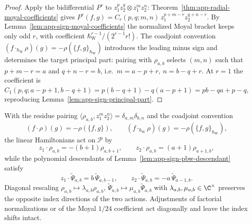\begin{proof}
  Apply the bidifferential \(P^r\) to
  \(z_1^pz_2^q\otimes z_1^mz_2^n\):
  Theorem~\ref{thm:app-radial-moyal-coefficients} gives
  \(P^r(f,g)=C_r(p,q;m,n)\,z_1^{p+m-r}z_2^{q+n-r}\).  By
  Lemma~\ref{lem:app-sign-moyal-coefficients} the normalized Moyal
  bracket keeps only odd \(r\), with coefficient
  \(\hbar_{\mathrm{W}}^{r-1}/(2^{r-1}r!)\).  The coadjoint convention
  \((f\cdot_{\hbar_{\mathrm{W}}}\rho)(g)=-\rho(\{f,g\}_{\hbar_{\mathrm{W}}})\) introduces the
  leading minus sign and determines the target principal part: pairing with
  \(\rho_{a,b}\) selects \((m,n)\) such that \(p+m-r=a\) and
  \(q+n-r=b\), i.e.\ \(m=a-p+r,\ n=b-q+r\).  At \(r=1\) the
  coefficient is
  \(C_1(p,q;a-p+1,b-q+1)=p(b-q+1)-q(a-p+1)=pb-qa+p-q\),
  reproducing Lemma~\ref{lem:app-sign-principal-part}.
\end{proof}

\begin{cor}
\label{cor:app-sign-universal-dual-normalization}
  With the residue pairing
  \(\langle\rho_{a,b},z_1^mz_2^n\rangle=\delta_{a,m}\delta_{b,n}\) and
  the coadjoint convention
  \[
    (f\cdot\rho)(g)=-\rho(\{f,g\}),\qquad
    (f\cdot_{\hbar_{\mathrm{W}}}\rho)(g)=-\rho(\{f,g\}_{\hbar_{\mathrm{W}}}),
  \]
  the linear Hamiltonians act on \(\mathcal P\) by
  \[
    z_1\cdot\rho_{a,b}=-(b+1)\rho_{a,b+1},\qquad
    z_2\cdot\rho_{a,b}=(a+1)\rho_{a+1,b},
  \]
  while the polynomial descendants of
  Lemma~\ref{lem:app-sign-pbw-descendant} satisfy
  \[
    z_1\cdot\widetilde\Psi_{a,b}=b\,\widetilde\Psi_{a,b-1},\qquad
    z_2\cdot\widetilde\Psi_{a,b}=-a\,\widetilde\Psi_{a-1,b}.
  \]
  Diagonal rescaling
  \(\rho_{a,b}\mapsto\lambda_{a,b}\rho_{a,b}\),
  \(\widetilde\Psi_{a,b}\mapsto\mu_{a,b}\widetilde\Psi_{a,b}\) with
  \(\lambda_{a,b},\mu_{a,b}\in\C^\times\) preserves the opposite index
  directions of the two actions.  Adjustments of factorial normalizations or of the Moyal
  \(1/24\) coefficient act diagonally and leave the index shifts
  intact.
\end{cor}

